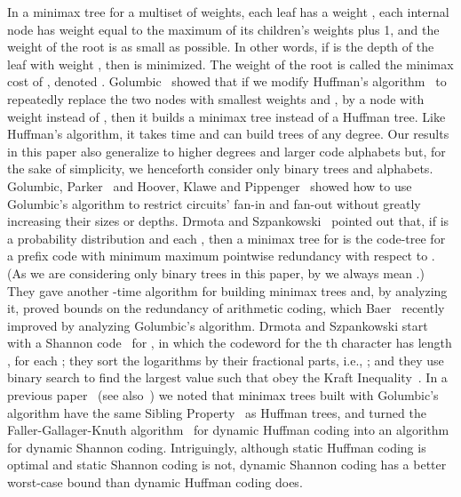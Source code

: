 \documentclass[runningheads]{llncs}
\begin{document}
In a minimax tree for a multiset  of weights, each leaf has a weight , each internal node has weight equal to the maximum of its children's weights plus 1, and the weight of the root is as small as possible.  In other words, if  is the depth of the leaf with weight , then  is minimized.  The weight of the root is called the minimax cost of , denoted .  Golumbic~\cite{Gol76} showed that if we modify Huffman's algorithm~\cite{Huf52} to repeatedly replace the two nodes with smallest weights  and , by a node with weight  instead of , then it builds a minimax tree instead of a Huffman tree.  Like Huffman's algorithm, it takes  time and can build trees of any degree.  Our results in this paper also generalize to higher degrees and larger code alphabets but, for the sake of simplicity, we henceforth consider only binary trees and alphabets.  Golumbic, Parker~\cite{Par79} and Hoover, Klawe and Pippenger~\cite{HKP84} showed how to use Golumbic's algorithm to restrict circuits' fan-in and fan-out without greatly increasing their sizes or depths.  Drmota and Szpankowski~\cite{DS02,DS04} pointed out that, if  is a probability distribution and each , then a minimax tree for  is the code-tree for a prefix code with minimum maximum pointwise redundancy with respect to .  (As we are considering only binary trees in this paper, by  we always mean .)  They gave another -time algorithm for building minimax trees and, by analyzing it, proved bounds on the redundancy of arithmetic coding, which Baer~\cite{Bae08} recently improved by analyzing Golumbic's algorithm.  Drmota and Szpankowski start with a \mbox{Shannon} code~\cite{Sha48} for , in which the codeword for the th character has length , for each ; they sort the logarithms by their fractional parts, i.e., ; and they use binary search to find the largest value  such that  obey the Kraft Inequality~\cite{Kra49}.  In a previous paper~\cite{Gag04} (see also~\cite{Gag07,KN??}) we noted that minimax trees built with Golumbic's algorithm have the same Sibling Property~\cite{Fal73,Gal78} as Huffman trees, and turned the Faller-Gallager-Knuth algorithm~\cite{Knu85} for dynamic Huffman coding into an algorithm for dynamic Shannon coding.  Intriguingly, although static Huffman coding is optimal and static Shannon coding is not, dynamic Shannon coding has a better worst-case bound than dynamic Huffman coding does.
\end{document}
